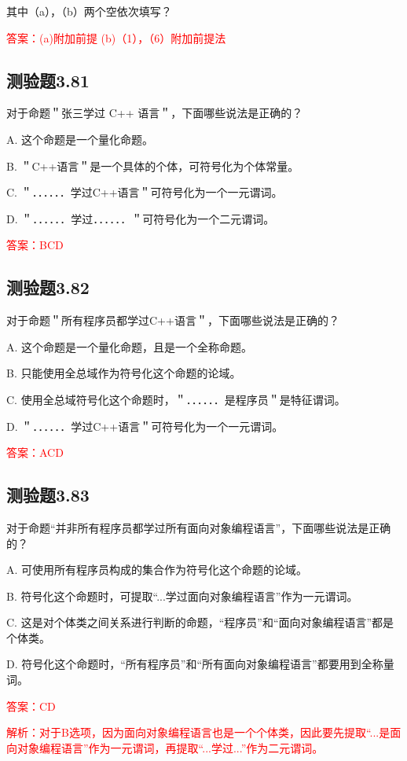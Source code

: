 \documentclass[UTF8, heading=true]{ctexart}
\begin{document}
其中（a），（b）两个空依次填写？

\textcolor{red}{答案：(a)附加前提 (b)（1），（6）附加前提法}

\subsection{测验题3.81}

对于命题＂张三学过 C++ 语言＂，下面哪些说法是正确的？

A. 这个命题是一个量化命题。

B. ＂C++语言＂是一个具体的个体，可符号化为个体常量。

C. ＂．．．．．．学过C++语言＂可符号化为一个一元谓词。

D. ＂．．．．．．学过．．．．．．＂可符号化为一个二元谓词。

\textcolor{red}{答案：BCD}

\subsection{测验题3.82}

对于命题＂所有程序员都学过C++语言＂，下面哪些说法是正确的？

A. 
这个命题是一个量化命题，且是一个全称命题。

B. 
只能使用全总域作为符号化这个命题的论域。

C. 
使用全总域符号化这个命题时，＂．．．．．．是程序员＂是特征谓词。

D. 
＂．．．．．．学过C++语言＂可符号化为一个一元谓词。

\textcolor{red}{答案：ACD}

\subsection{测验题3.83}

对于命题“并非所有程序员都学过所有面向对象编程语言”，下面哪些说法是正确的？

A. 可使用所有程序员构成的集合作为符号化这个命题的论域。

B. 符号化这个命题时，可提取“...学过面向对象编程语言”作为一元谓词。

C. 这是对个体类之间关系进行判断的命题，“程序员”和“面向对象编程语言”都是个体类。

D. 符号化这个命题时，“所有程序员”和“所有面向对象编程语言”都要用到全称量词。

\textcolor{red}{答案：CD}

\textcolor{red}{解析：对于B选项，因为面向对象编程语言也是一个个体类，因此要先提取“...是面向对象编程语言”作为一元谓词，再提取“...学过...”作为二元谓词。}
\end{document}
